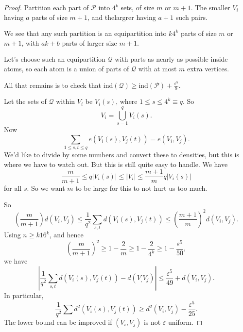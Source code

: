\documentclass[a4paper]{article}
\newcommand\ind{\mathrm{ind}}
\begin{document}
\begin{proof}
  Partition each part of $\mathcal{P}$ into $4^k$ sets, of size $m$ or $m + 1$. The smaller $V_i$ having $a$ parts of size $m + 1$, and thelargrer having $a + 1$ such pairs.

  We see that any such partition is an equipartition into $k 4^k$ parts of size $m$ or $m + 1$, with $ak + b$ parts of larger size $m + 1$.

  Let's choose such an equipartition $\mathcal{Q}$ with parts as nearly as possible inside atoms, so each atom is a union of parts of $\mathcal{Q}$ with at most $m$ extra vertices.

  All that remains is to check that $\ind (\mathcal{Q}) \geq \ind(\mathcal{P}) + \frac{\varepsilon^5}{8}$.

  Let the sets of $\mathcal{Q}$ within $V_i$ be $V_i(s)$, where $1 \leq s \leq 4^k \equiv q$. So
  \[
    V_i = \bigcup_{s = 1}^q V_i(s).
  \]
  Now
  \[
    \sum_{1 \leq s, t \leq q} e(V_i(s), V_j(t)) = e(V_i, V_j).
  \]
  We'd like to divide by some numbers and convert these to densities, but this is where we have to watch out. But this is still quite easy to handle. We have
  \[
    \frac{m}{m + 1} \leq q |V_i(s)| \leq |V_i| \leq \frac{m + 1}{m} q |V_i(s)|
  \]
  for all $s$. So we want $m$ to be large for this to not hurt us too much.

  So
  \[
    \left(\frac{m}{m + 1}\right) d(V_i, V_j) \leq \frac{1}{q^2} \sum_{s, t} d(V_i(s), V_j(t)) \leq \left(\frac{m + 1}{m}\right)^2 d(V_i, V_j).
  \]
  Using $n \geq k 16^k$, and hence
  \[
    \left(\frac{m}{m + 1}\right)^2 \geq  1 - \frac{2}{m} \geq 1 - \frac{2}{4^k} \geq 1 - \frac{\varepsilon^5}{50},
  \]
  we have
  \[
    \left|\frac{1}{q^2} \sum_{s, t} d(V_i(s), V_j(t)) - d(V_, V_j)\right| \leq \frac{\varepsilon^5}{49} + d(V_i, V_j). %
  \]
  In particular,
  \[
    \frac{1}{q^2} \sum d^2(V_i(s), V_j(t)) \geq d^2(V_i, V_j) - \frac{\varepsilon^5}{25}.
  \]
  The lower bound can be improved if $(V_i, V_j)$ is not $\varepsilon$-uniform.


\end{proof}
\end{document}
